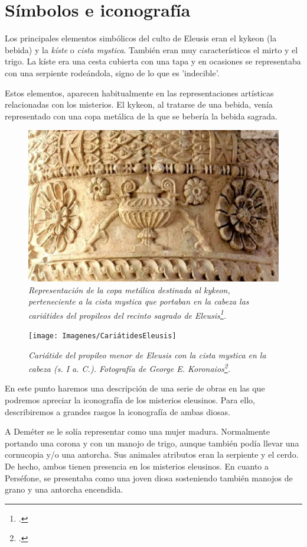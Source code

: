 \section{Símbolos e iconografía}

Los principales elementos simbólicos del culto de Eleusis eran el kykeon (la bebida) y la \textit{kíste} o \textit{cista mystica}. También eran muy característicos el mirto y el trigo. 
La kíste era una cesta cubierta con una tapa y en ocasiones se representaba con una serpiente rodeándola, signo de lo que es 'indecible'.

Estos elementos, aparecen habitualmente en las representaciones artísticas relacionadas con los misterios. El kykeon, al tratarse de una bebida, venía representado con una copa metálica de la que se bebería la bebida sagrada.

\begin{figure}[h!]
	\centering
	\includegraphics[width=0.45\linewidth]{Imagenes/CopaKykeon}
	\caption{\textit{Representación de la copa metálica destinada al kykeon, perteneciente a la cista mystica que portaban en la cabeza las cariátides del propileos del recinto sagrado de Eleusis\footcite[35]{calvosorianoMisteriosEleusisImagenes2022}.}}
	\label{fig:copa kykeon cariatides}
\end{figure}

\begin{figure}[h!]
	\centering
	\texttt{[image: Imagenes/CariátidesEleusis]}
	\caption{\textit{Cariátide del propileo menor de Eleusis con la cista mystica en la cabeza (s. I a. C.).  Fotografía de George E. Koronaios\footcite[]{koronaiosCaryatidLesserPropylaia2018}.}}
	\label{fig:cariatides propileo menor}
\end{figure}

En este punto haremos una descripción de una serie de obras en las que podremos apreciar la iconografía de los misterios eleusinos. Para ello, describiremos a grandes rasgos la iconografía de ambas diosas. 

A Deméter se le solía representar como una mujer madura. Normalmente portando una corona y con un manojo de trigo, aunque también podía llevar una cornucopia y/o una antorcha. Sus animales atributos eran la serpiente y el cerdo. De hecho, ambos tienen presencia en los misterios eleusinos. En cuanto a Perséfone, se presentaba como una joven diosa sosteniendo también manojos de grano y una antorcha encendida. 

